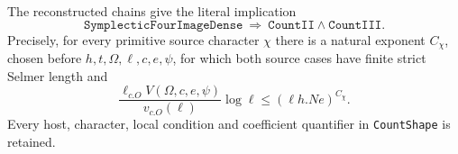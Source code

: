 \begin{theorem}
\label{claim:JX1}
The reconstructed chains give the literal implication
\[
 \boxed{\quad
 \texttt{SymplecticFourImageDense}
      \ \Longrightarrow\
              \texttt{CountII}\wedge\texttt{CountIII}.
 \quad}                                                        \tag{JX.1}
\]
Precisely, for every primitive source character $\chi$ there
is a natural exponent $C_\chi$, chosen before
$h,t,\Omega,\ell,c,e,\psi$, for which both source cases have
finite strict Selmer length and
\[
 \frac{\ell_{c.O}V(\Omega,c,e,\psi)}{v_{c.O}(\ell)}
                  \log\ell
                     \le(\ell h.N e)^{C_\chi}.                 \tag{JX.2}
\]
Every host, character, local condition and coefficient
quantifier in \texttt{CountShape} is retained.
\end{theorem}
